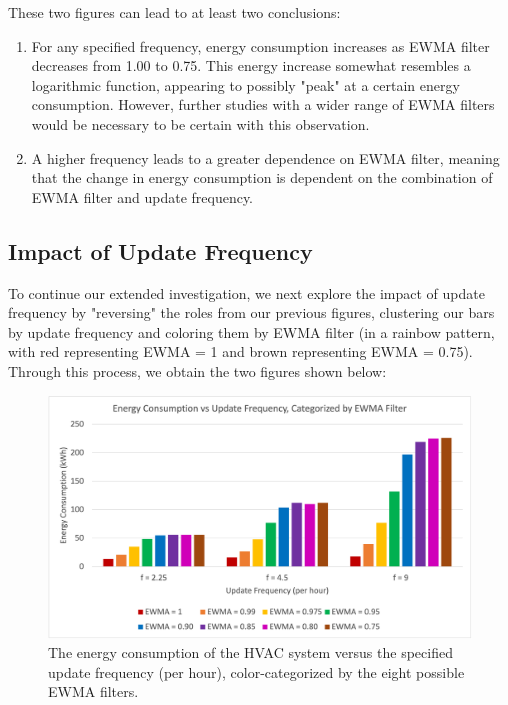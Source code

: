 \documentclass[conference,letterpaper]{IEEEtran}
\begin{document}
These two figures can lead to at least two conclusions:
\begin{enumerate}
\item For any specified frequency, energy consumption increases as EWMA filter decreases from 1.00 to 0.75. This energy increase somewhat resembles a logarithmic function, appearing to possibly "peak" at a certain energy consumption. However, further studies with a wider range of EWMA filters would be necessary to be certain with this observation.
\item A higher frequency leads to a greater dependence on EWMA filter, meaning that the change in energy consumption is dependent on the combination of EWMA filter and update frequency.
\end{enumerate}

\subsection{Impact of Update Frequency}
To continue our extended investigation, we next explore the impact of update frequency by "reversing" the roles from our previous figures, clustering our bars by update frequency and coloring them by EWMA filter (in a rainbow pattern, with red representing EWMA = 1 and brown representing EWMA = 0.75). Through this process, we obtain the two figures shown below:
\begin{figure}[H]
    \includegraphics[scale=0.48]{barfreq.png}
    \caption{The energy consumption of the HVAC system versus the specified update frequency (per hour), color-categorized by the eight possible EWMA filters.}
\end{figure}
\end{document}
